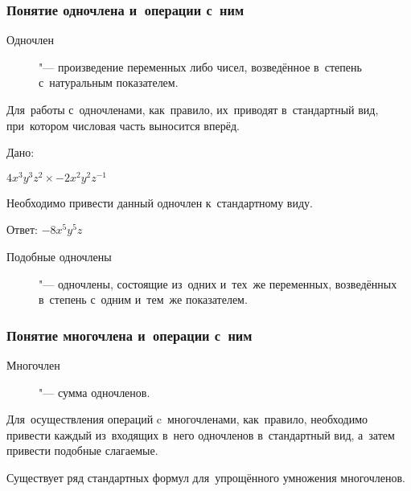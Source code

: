 \documentclass[]{scrartcl}
\begin{document}
\subsubsection{Понятие одночлена и~операции с~ним}
\begin{description}
	\item[Одночлен] "--- произведение переменных либо чисел, возведённое в~степень с~натуральным показателем.
\end{description}
Для~работы с~одночленами, как~правило, их~приводят в~стандартный вид, при~котором числовая часть выносится вперёд.
\begin{Thexmpl}\label{ex:monomial-1}
	Дано:
	
	$4x^{3}y^{3}z^{2} \times -2x^{2}y^{2}z^{-1}$
	
	Необходимо привести данный одночлен к~стандартному виду.
	
	Ответ: $-8x^{5}y^{5}z$
\end{Thexmpl}

\begin{description}
	\item[Подобные одночлены] "--- одночлены, состоящие из~одних и~тех~же переменных, возведённых в~степень с~одним и~тем~же показателем.
\end{description}

\subsubsection{Понятие многочлена и~операции с~ним}
\begin{description}
	\item[Многочлен] "--- сумма одночленов.
\end{description}
Для~осуществления операций c~многочленами, как~правило, необходимо привести каждый из~входящих в~него одночленов в~стандартный вид, а~затем привести подобные слагаемые.

Существует ряд стандартных формул для~упрощённого умножения многочленов.
\end{document}
